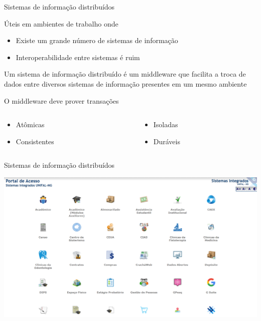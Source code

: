 \documentclass[compress]{beamer}
\begin{document}

\begin{frame}{Sistemas de informação distribuídos}

Úteis em ambientes de trabalho onde
\begin{itemize}
    \item Existe um grande número de sistemas de informação
    \item Interoperabilidade entre sistemas é ruim
\end{itemize}

\vspace{0.5cm}

Um sistema de informação distribuído é um middleware que facilita a troca de dados entre diversos sistemas de informação presentes em um mesmo ambiente

\vspace{0.5cm}

O middleware deve prover transações
\begin{columns}[T]
    \begin{column}{.35\textwidth}
        \begin{itemize}
            \item Atômicas
            \item Consistentes    
        \end{itemize}
    \end{column}
    \begin{column}{.49\textwidth}
        \begin{itemize}
            \item Isoladas
            \item Duráveis
        \end{itemize}    
    \end{column}
\end{columns}
\end{frame}


\begin{frame}{Sistemas de informação distribuídos}

\centering \includegraphics[width=\textwidth]{images/sistemas_unifal.png}

\end{frame}
\end{document}
